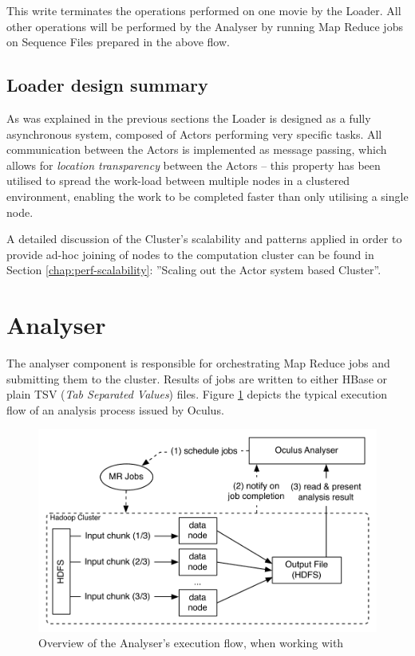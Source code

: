 This write terminates the operations performed on one movie by the Loader. All other operations will be performed by the Analyser by running Map Reduce jobs on Sequence Files prepared in the above flow.

\subsection{Loader design summary}
As was explained in the previous sections the Loader is designed as a fully asynchronous system, composed of Actors performing very specific tasks. All communication between the Actors is implemented as message passing, which allows for \textit{location transparency} between the Actors -- this property has been utilised to spread the work-load between multiple nodes in a clustered environment, enabling the work to be completed faster than only utilising a single node.

A detailed discussion of the Cluster's scalability and patterns applied in order to provide ad-hoc joining of nodes to the computation cluster can be found in Section \ref{chap:perf-scalability}: ''Scaling out the Actor system based Cluster''.

\section{Analyser}
\label{sec:analyser}
The analyser component is responsible for orchestrating Map Reduce jobs and submitting them to the cluster. Results of jobs are written to either HBase or plain TSV (\textit{Tab Separated Values}) files. Figure \ref{fig:analyser-high-level} depicts the typical execution flow of an analysis process issued by Oculus.

\begin{figure}[ch!]
  \centering
  \includegraphics[scale=0.9]{img/analyser-high-level}
  \caption{Overview of the Analyser's execution flow, when working with}
  \label{fig:analyser-high-level}
\end{figure}

